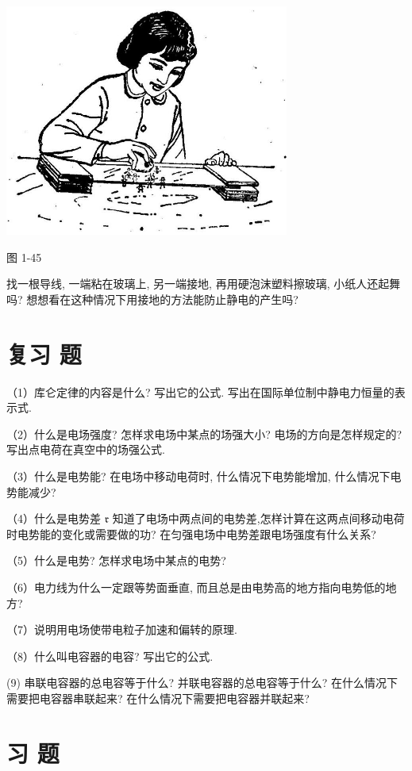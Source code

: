 \documentclass[10pt]{article}
\begin{document}
\begin{center}
\includegraphics[max width=0.7\textwidth]{images/01913056-1f15-74d8-9184-9aab52c9d66b_55_729208.jpg}
\end{center}

图 1-45

找一根导线, 一端粘在玻璃上, 另一端接地, 再用硬泡沫塑料擦玻璃, 小纸人还起舞吗? 想想看在这种情况下用接地的方法能防止静电的产生吗?

\section*{复习 题}

（1）库仑定律的内容是什么? 写出它的公式. 写出在国际单位制中静电力恒量的表示式.

（2）什么是电场强度? 怎样求电场中某点的场强大小? 电场的方向是怎样规定的? 写出点电荷在真空中的场强公式.

（3）什么是电势能? 在电场中移动电荷时, 什么情况下电势能增加, 什么情况下电势能减少?

（4）什么是电势差 \(\mathfrak{r}\) 知道了电场中两点间的电势差,怎样计算在这两点间移动电荷时电势能的变化或需要做的功? 在匀强电场中电势差跟电场强度有什么关系?

（5）什么是电势? 怎样求电场中某点的电势?

（6）电力线为什么一定跟等势面垂直, 而且总是由电势高的地方指向电势低的地方?

（7）说明用电场使带电粒子加速和偏转的原理.

（8）什么叫电容器的电容? 写出它的公式.

(9) 串联电容器的总电容等于什么? 并联电容器的总电容等于什么? 在什么情况下需要把电容器串联起来? 在什么情况下需要把电容器并联起来?

\section*{习 题}
\end{document}
